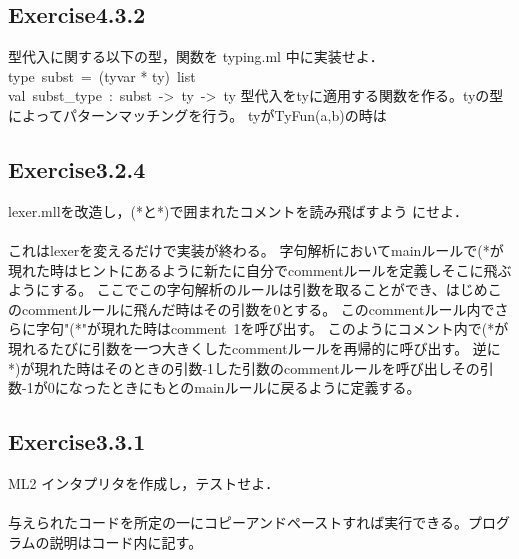 \documentclass[a4paper,11pt,oneside,openany]{jsarticle}
\begin{document}
    

\subsection{Exercise4.3.2}
型代入に関する以下の型，関数を typing.ml 中に実装せよ． type\ subst\ =\ (tyvar * ty)\ list\\
val\ subst\_type\ :\ subst\ ->\ ty\ ->\ ty 
    型代入をtyに適用する関数を作る。tyの型によってパターンマッチングを行う。
    tyがTyFun(a,b)の時は

\subsection{Exercise3.2.4}
    lexer.mllを改造し，(*と*)で囲まれたコメントを読み飛ばすよう にせよ．\\\\
    これはlexerを変えるだけで実装が終わる。
    字句解析においてmainルールで(*が現れた時はヒントにあるように新たに自分でcommentルールを定義しそこに飛ぶようにする。
    ここでこの字句解析のルールは引数を取ることができ、はじめこのcommentルールに飛んだ時はその引数を0とする。
    このcommentルール内でさらに字句"(*"が現れた時はcomment\ 1を呼び出す。
    このようにコメント内で(*が現れるたびに引数を一つ大きくしたcommentルールを再帰的に呼び出す。
    逆に*)が現れた時はそのときの引数-1した引数のcommentルールを呼び出しその引数-1が0になったときにもとのmainルールに戻るように定義する。




\subsection{Exercise3.3.1}
    ML2 インタプリタを作成し，テストせよ．\\\\
    与えられたコードを所定の一にコピーアンドペーストすれば実行できる。プログラムの説明はコード内に記す。
\end{document}
